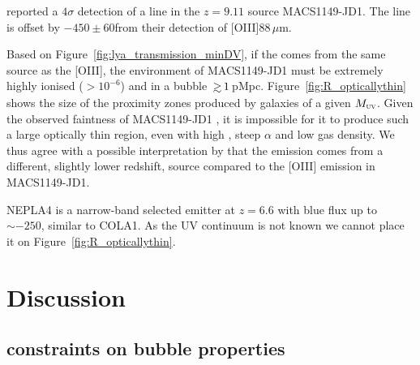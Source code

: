 \documentclass[fleqn,usenatbib]{mnras}
\begin{document}
\citet{Hashimoto2018a} reported a $4\sigma$ detection of a \lya line in the $z=9.11$ source MACS1149-JD1. The \lya line is offset by $-450\pm60$\kms from their detection of [OIII]88\,$\mu$m. 

Based on Figure~\ref{fig:lya_transmission_minDV}, if the \lya comes from the same source as the [OIII], the environment of MACS1149-JD1 must be extremely highly ionised ($>10^{-6}$) and in a bubble $\simgt1$\,pMpc. Figure~\ref{fig:R_opticallythin} shows the size of the proximity zones produced by galaxies of a given $\MUV$. Given the observed faintness of MACS1149-JD1 \citep[$\MUV = 18.5\pm0.1$ based on lens modelling and fits to photometry and grism spectroscopy,][]{Hoag2018a}, it is impossible for it to produce such a large optically thin region, even with high \fesc, steep $\alpha$ and low gas density. We thus agree with a possible interpretation by \citet{Hashimoto2018a} that the \lya emission comes from a different, slightly lower redshift, source compared to the [OIII] emission in MACS1149-JD1.

NEPLA4 \citep{Songaila2018} is a narrow-band selected \lya emitter at $z=6.6$ with blue flux up to $\sim-250$\kms, similar to COLA1. As the UV continuum is not known we cannot place it on Figure~\ref{fig:R_opticallythin}.

\section{Discussion}
\label{sec:disc}

\subsection{\lya constraints on bubble properties}
\label{sec:disc_redpeaks}
\end{document}
